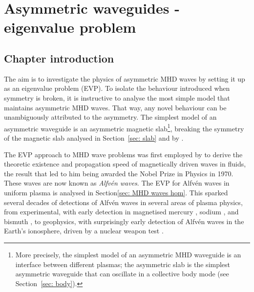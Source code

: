 \documentclass[12pt]{../style-files/ociamthesis}
\begin{document}
\baselineskip=18pt

\setcounter{secnumdepth}{3}
\setcounter{tocdepth}{3}

\setcounter{chapter}{1}


\newcommand{\bv}{\mathbf{v}}
\newcommand{\bB}{\mathbf{B}}


\newcommand{\figdir}{../main/figures/chpt-2/} %

\chapter{Asymmetric waveguides - eigenvalue problem}
\label{chap: EVP}


\section{Chapter introduction}
\label{sec: EVP intro}

The aim is to investigate the physics of asymmetric MHD waves by setting it up as an eigenvalue problem (EVP). To isolate the behaviour introduced when symmetry is broken, it is instructive to analyse the most simple model that maintains asymmetric MHD waves. That way, any novel behaviour can be unambiguously attributed to the asymmetry. The simplest model of an asymmetric waveguide is an asymmetric magnetic slab\footnote{More precisely, the simplest model of an asymmetric MHD waveguide is an interface between different plasmas; the asymmetric slab is the simplest asymmetric waveguide that can oscillate in a collective body mode (see Section~\ref{sec: body}).}, breaking the symmetry of the magnetic slab analysed in Section~\ref{sec: slab} and by \cite{rob81b}.

The EVP approach to MHD wave problems was first employed by \cite{alf42} to derive the theoretic existence and propagation speed of magnetically driven waves in fluids, the result that led to him being awarded the Nobel Prize in Physics in 1970. These waves are now known as \textit{Alfv\'{e}n waves}. The EVP for Alfv\'{e}n waves in uniform plasma is analysed in Section\ref{sec: MHD waves hom}. This sparked several decades of detections of Alfv\'{e}n waves in several areas of plasma physics, from experimental, with early detection in magnetised mercury \citep{lun49}, sodium \citep{leh54}, and bismuth \citep{hes_etal73}, to geophysics, with surprisingly early detection of Alfv\'{e}n waves in the Earth's ionosphere, driven by a nuclear weapon test \citep{ber_etal60}.
\end{document}
